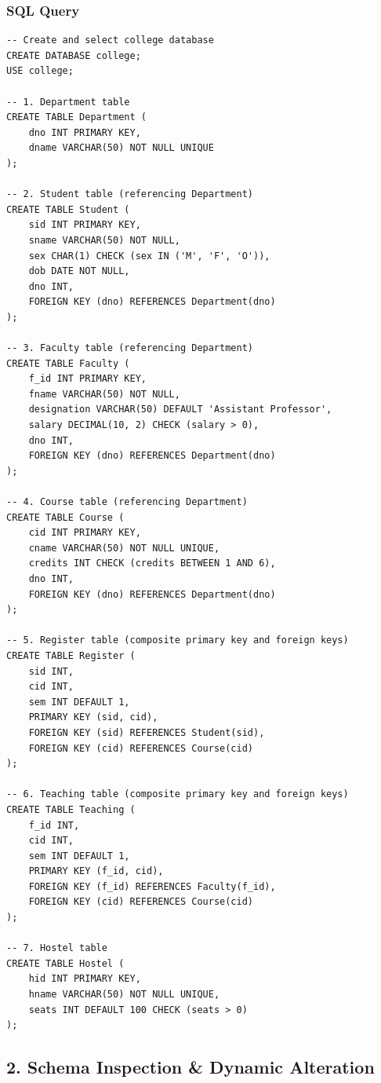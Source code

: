 \subsubsection*{SQL Query}
\begin{lstlisting}[basicstyle=\ttfamily\footnotesize,caption={Creating college database and relational tables with integrity constraints}]
-- Create and select college database
CREATE DATABASE college;
USE college;

-- 1. Department table
CREATE TABLE Department (
    dno INT PRIMARY KEY,
    dname VARCHAR(50) NOT NULL UNIQUE
);

-- 2. Student table (referencing Department)
CREATE TABLE Student (
    sid INT PRIMARY KEY,
    sname VARCHAR(50) NOT NULL,
    sex CHAR(1) CHECK (sex IN ('M', 'F', 'O')),
    dob DATE NOT NULL,
    dno INT,
    FOREIGN KEY (dno) REFERENCES Department(dno)
);

-- 3. Faculty table (referencing Department)
CREATE TABLE Faculty (
    f_id INT PRIMARY KEY,
    fname VARCHAR(50) NOT NULL,
    designation VARCHAR(50) DEFAULT 'Assistant Professor',
    salary DECIMAL(10, 2) CHECK (salary > 0),
    dno INT,
    FOREIGN KEY (dno) REFERENCES Department(dno)
);

-- 4. Course table (referencing Department)
CREATE TABLE Course (
    cid INT PRIMARY KEY,
    cname VARCHAR(50) NOT NULL UNIQUE,
    credits INT CHECK (credits BETWEEN 1 AND 6),
    dno INT,
    FOREIGN KEY (dno) REFERENCES Department(dno)
);

-- 5. Register table (composite primary key and foreign keys)
CREATE TABLE Register (
    sid INT,
    cid INT,
    sem INT DEFAULT 1,
    PRIMARY KEY (sid, cid),
    FOREIGN KEY (sid) REFERENCES Student(sid),
    FOREIGN KEY (cid) REFERENCES Course(cid)
);

-- 6. Teaching table (composite primary key and foreign keys)
CREATE TABLE Teaching (
    f_id INT,
    cid INT,
    sem INT DEFAULT 1,
    PRIMARY KEY (f_id, cid),
    FOREIGN KEY (f_id) REFERENCES Faculty(f_id),
    FOREIGN KEY (cid) REFERENCES Course(cid)
);

-- 7. Hostel table
CREATE TABLE Hostel (
    hid INT PRIMARY KEY,
    hname VARCHAR(50) NOT NULL UNIQUE,
    seats INT DEFAULT 100 CHECK (seats > 0)
);
\end{lstlisting}

\vspace{0.2cm}

\subsection*{2. Schema Inspection \& Dynamic Alteration}


